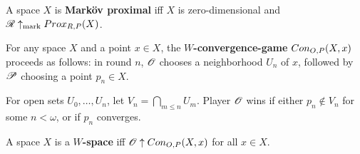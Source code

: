 \begin{definition}
  A space $X$ is \textbf{Mark\"ov proximal} iff $X$ is zero-dimensional and $\mathscr{R}\uparrow_{\text{mark}}Prox_{R,P}(X)$.
\end{definition}

\begin{definition}
  For any space $X$ and a point $x\in X$, the \textbf{$W$-convergence-game} $Con_{O,P}(X,x)$ proceeds as follows: in round $n$, $\mathscr{O}$ chooses a neighborhood $U_n$ of $x$, followed by $\mathscr{P}$ choosing a point $p_n\in X$.

  For open sets $U_0,\dots,U_n$, let $V_n=\bigcap_{m\leq n} U_m$. Player $\mathscr{O}$ wins if either $p_n\not\in V_n$ for some $n<\omega$, or if $p_n$ converges.
\end{definition}

\begin{definition}
  A space $X$ is a \textbf{$W$-space} iff $\mathscr{O}\uparrow Con_{O,P}(X,x)$ for all $x\in X$.
\end{definition}








